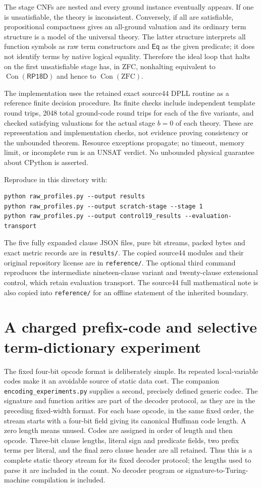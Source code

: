 \documentclass[11pt]{article}
\newcommand{\Eq}{\mathsf{Eq}}
\newcommand{\Con}{\operatorname{Con}}
\newcommand{\RP}{\mathsf{RP18D}}
\begin{document}
The stage CNFs are nested and every ground instance eventually appears.
If one is unsatisfiable, the theory is inconsistent. Conversely, if
all are satisfiable, propositional compactness gives an all-ground
valuation and its ordinary term structure is a model of the universal
theory. The latter structure interprets all function symbols as raw
term constructors and $\Eq$ as the given predicate; it does not identify
terms by native logical equality. Therefore the ideal loop that halts
on the first unsatisfiable stage has, in ZFC, nonhalting equivalent to
$\Con(\RP)$ and hence to $\Con(\mathrm{ZFC})$.

The implementation uses the retained exact source44 DPLL routine as a
reference finite decision procedure. Its finite checks include independent
template round trips, 2048 total ground-code round trips for each of the
five variants, and checked satisfying valuations for the actual stage
$b=0$ of each theory. These are representation and implementation checks,
not evidence proving consistency or the unbounded theorem. Resource
exceptions propagate; no timeout, memory limit, or incomplete run is an
UNSAT verdict. No unbounded physical guarantee about CPython is asserted.

Reproduce in this directory with:
\begin{verbatim}
python raw_profiles.py --output results
python raw_profiles.py --output scratch-stage --stage 1
python raw_profiles.py --output control19_results --evaluation-transport
\end{verbatim}
The five fully expanded clause JSON files, pure bit streams, packed bytes
and exact metric records are in \texttt{results/}. The copied source44
modules and their original repository license are in \texttt{reference/}.
The optional third command reproduces the intermediate nineteen-clause
variant and twenty-clause extensional control, which retain evaluation
transport. The source44 full mathematical note is also copied into
\texttt{reference/} for an offline statement of the inherited boundary.

\section{A charged prefix-code and selective term-dictionary experiment}

The fixed four-bit opcode format is deliberately simple. Its repeated
local-variable codes make it an avoidable source of static data cost.
The companion \texttt{encoding\_experiments.py} supplies a second,
precisely defined generic codec. The signature and function arities are
part of the decoder protocol, as they are in the preceding fixed-width
format. For each base opcode, in the same fixed order, the stream starts
with a four-bit field giving its canonical Huffman code length. A zero
length means unused. Codes are assigned in order of length and then
opcode. Three-bit clause lengths, literal sign and predicate fields,
two prefix terms per literal, and the final zero clause header are all
retained. Thus this is a complete static theory stream for its fixed
decoder protocol; the lengths used to parse it are included in the count.
No decoder program or signature-to-Turing-machine compilation is included.
\end{document}
